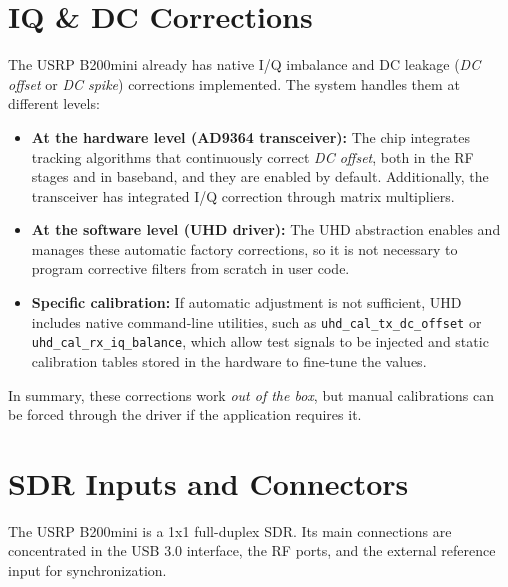 \documentclass[11pt]{article}
\begin{document}
\section{IQ \& DC Corrections}
The USRP B200mini already has native I/Q imbalance and DC leakage (\textit{DC offset} or \textit{DC spike}) corrections implemented. The system handles them at different levels:

\begin{itemize}
    \item \textbf{At the hardware level (AD9364 transceiver):} The chip integrates tracking algorithms that continuously correct \textit{DC offset}, both in the RF stages and in baseband, and they are enabled by default. Additionally, the transceiver has integrated I/Q correction through matrix multipliers.
    \item \textbf{At the software level (UHD driver):} The UHD abstraction enables and manages these automatic factory corrections, so it is not necessary to program corrective filters from scratch in user code.
    \item \textbf{Specific calibration:} If automatic adjustment is not sufficient, UHD includes native command-line utilities, such as \texttt{uhd\_cal\_tx\_dc\_offset} or \texttt{uhd\_cal\_rx\_iq\_balance}, which allow test signals to be injected and static calibration tables stored in the hardware to fine-tune the values.
\end{itemize}

In summary, these corrections work \textit{out of the box}, but manual calibrations can be forced through the driver if the application requires it.

\section{SDR Inputs and Connectors}
The USRP B200mini is a 1x1 full-duplex SDR. Its main connections are concentrated in the USB 3.0 interface, the RF ports, and the external reference input for synchronization.
\end{document}
